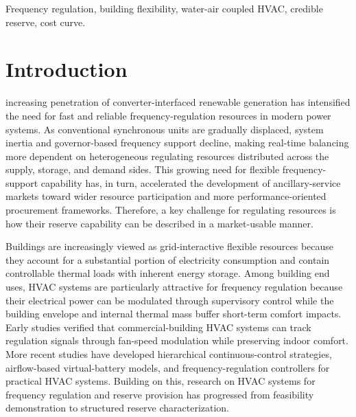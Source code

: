 \documentclass[journal]{IEEEtran}
\theoremstyle{remark}
\begin{document}
\begin{IEEEkeywords}
Frequency regulation, building flexibility, water-air coupled HVAC, credible reserve, cost curve.
\end{IEEEkeywords}

\section{Introduction}
\label{sec:introduction}

 increasing penetration of converter-interfaced renewable generation has intensified the need for fast and reliable frequency-regulation resources in modern power systems\cite{ratnam2020future}. As conventional synchronous units are gradually displaced, system inertia and governor-based frequency support decline, making real-time balancing more dependent on heterogeneous regulating resources distributed across the supply, storage, and demand sides\cite{anderson2021frequency,he2024analysis}. This growing need for flexible frequency-support capability has, in  turn, accelerated the development of ancillary-service markets toward  wider resource participation and more performance-oriented procurement  frameworks\cite{rancilio2022ancillary}. Therefore, a key challenge for regulating resources is how their reserve capability can be described in a market-usable manner\cite{koltsaklis2023assessing}.

Buildings are increasingly viewed as grid-interactive flexible resources because they account for a substantial portion of electricity consumption and contain controllable thermal loads with inherent energy storage\cite{tang2021flexibility}. Among building end uses, HVAC systems are particularly attractive for frequency regulation because their electrical power can be modulated through supervisory control while the building envelope and internal thermal mass buffer short-term comfort impacts\cite{hwang2023demand,ding2024flexibility}. Early studies verified that commercial-building HVAC systems can track regulation signals through fan-speed modulation while preserving indoor comfort\cite{lin2015experimental,beil2016frequency}. More recent studies have developed hierarchical continuous-control strategies\cite{wang2021hierarchical}, airflow-based virtual-battery models\cite{wang2020operating}, and frequency-regulation controllers for practical HVAC systems\cite{zhou2024hybrid}. Building on this, research on HVAC systems for frequency regulation and reserve provision has progressed from feasibility demonstration to structured reserve characterization. 
\end{document}
